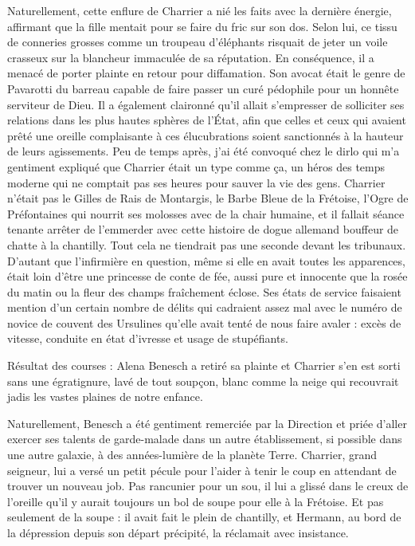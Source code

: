 Naturellement, cette enflure de Charrier a nié les faits avec la dernière énergie, affirmant que la fille mentait pour se faire du fric sur son dos. Selon lui, ce tissu de conneries grosses comme un troupeau d’éléphants risquait de jeter un voile crasseux sur la blancheur immaculée de sa réputation. En conséquence, il a menacé de porter plainte en retour pour diffamation. Son avocat était le genre de Pavarotti du barreau capable de faire passer un curé pédophile pour un honnête serviteur de Dieu. Il a également claironné qu’il allait s’empresser de solliciter ses relations dans les plus hautes sphères de l’État, afin que celles et ceux qui avaient prêté une oreille complaisante à ces élucubrations soient sanctionnés à la hauteur de leurs agissements. Peu de temps après, j’ai été convoqué chez le dirlo qui m’a gentiment expliqué que Charrier était un type comme ça, un héros des temps moderne qui ne comptait pas ses heures pour sauver la vie des gens. Charrier n’était pas le Gilles de Rais de Montargis, le Barbe Bleue de la Frétoise, l’Ogre de Préfontaines qui nourrit ses molosses avec de la chair humaine, et il fallait séance tenante arrêter de l’emmerder avec cette histoire de dogue allemand bouffeur de chatte à la chantilly. Tout cela ne tiendrait pas une seconde devant les tribunaux. D’autant que l’infirmière en question, même si elle en avait toutes les apparences, était loin d’être une princesse de conte de fée, aussi pure et innocente que la rosée du matin ou la fleur des champs fraîchement éclose. Ses états de service faisaient mention d’un certain nombre de délits qui cadraient assez mal avec le numéro de novice de couvent des Ursulines qu’elle avait tenté de nous faire avaler : excès de vitesse, conduite en état d’ivresse et usage de stupéfiants.

Résultat des courses : Alena Benesch a retiré sa plainte et Charrier s’en est sorti sans une égratignure, lavé de tout soupçon, blanc comme la neige qui recouvrait jadis les vastes plaines de notre enfance.

Naturellement, Benesch a été gentiment remerciée par la Direction et priée d’aller exercer ses talents de garde-malade dans un autre établissement, si possible dans une autre galaxie, à des années-lumière de la planète Terre. Charrier, grand seigneur, lui a versé un petit pécule pour l’aider à tenir le coup en attendant de trouver un nouveau job. Pas rancunier pour un sou, il lui a glissé dans le creux de l’oreille qu’il y aurait toujours un bol de soupe pour elle à la Frétoise. Et pas seulement de la soupe : il avait fait le plein de chantilly, et Hermann, au bord de la dépression depuis son départ précipité, la réclamait avec insistance.

